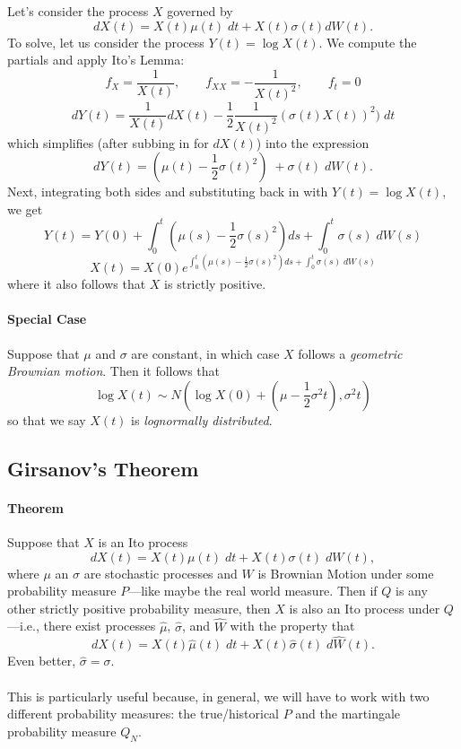 \documentclass[a4paper,12pt]{scrartcl}
\begin{document}
Let's consider the process $X$ governed by
   \[ dX(t) = X(t)\mu(t) \; dt + X(t) \sigma(t) dW(t).\]
To solve, let us consider the process $Y(t) = \log X(t)$.  We compute
the partials and apply Ito's Lemma:
   \[ f_X = \frac{1}{X(t)}, \qquad f_{XX} = -\frac{1}{X(t)^2},
      \qquad f_t = 0 \]
   \[ dY(t) = \frac{1}{X(t)} dX(t) - \frac{1}{2}\frac{1}{X(t)^2}
      (\sigma(t) X(t))^2 ) \; dt \]
which simplifies (after subbing in for $dX(t)$) into the expression
   \[ dY(t) = \left( \mu(t) - \frac{1}{2}\sigma(t)^2\right) \; +
      \sigma(t) \; dW(t).\]
Next, integrating both sides and substituting back in with
$Y(t) = \log X(t)$, we get
   \[ Y(t) = Y(0) + \int^t_0 \left( \mu(s)-\frac{1}{2}\sigma(s)^2\right) 
      ds + \int^t_0 \sigma(s) \; dW(s) \]
   \[ X(t)=X(0) e^{\int^t_0 \left( \mu(s)-\frac{1}{2}\sigma(s)^2\right) 
       ds + \int^t_0 \sigma(s) \; dW(s)}\]
where it also follows that $X$ is strictly positive.

\paragraph{Special Case} Suppose that $\mu$ and $\sigma$ are constant,
in which case $X$ follows a \emph{geometric Brownian motion}.  Then
it follows that 
   \[ \log X(t) \sim N\left( \log X(0) + \left(\mu - \frac{1}{2} \sigma^2
      t\right), \sigma^2 t \right) \]
so that we say $X(t)$ is \emph{lognormally distributed}.

\subsection{Girsanov's Theorem}

\paragraph{Theorem} Suppose that $X$ is an Ito process
   \[ dX(t) = X(t) \mu(t) \; dt + X(t) \sigma(t) \; dW(t),\]
where $\mu$ an $\sigma$ are stochastic processes and $W$ is Brownian
Motion under some probability measure $P$---like maybe the real 
world measure.  Then if $Q$ is any other strictly positive probability
measure, then $X$ is also an Ito process under $Q$---i.e., there
exist processes $\hat{\mu}$, $\hat{\sigma}$, and $\hat{W}$ with the
property that
\begin{equation}
\label{Girsanov}
    dX(t) = X(t) \hat{\mu}(t) \; dt + X(t) \hat{\sigma}(t) \; 
      d\hat{W}(t).
\end{equation}
Even better, $\hat{\sigma} = \sigma$.
\\
\\
This is particularly useful because, in general, we will have to work 
with two different probability measures: the true/historical $P$ and
the martingale probability measure $Q_N$. 
\end{document}
